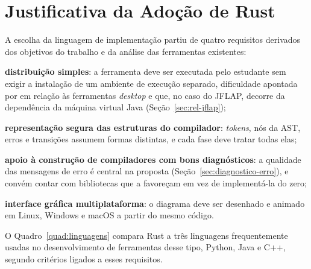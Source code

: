 \documentclass[
    12pt
    ,oneside
    ,a4paper
    ,chapter=TITLE
    ,section=TITLE
    ,sumario=abnt-6027-2012]{abntex2}
\begin{document}
\section{Justificativa da Adoção de Rust}
\label{sec:rust-justificativa}

A escolha da linguagem de implementação partiu de quatro requisitos derivados dos objetivos
do trabalho e da análise das ferramentas existentes:

\begin{alineas}
    \item \textbf{distribuição simples}: a ferramenta deve ser executada pelo estudante sem
    exigir a instalação de um ambiente de execução separado, dificuldade apontada por
     em relação às ferramentas \textit{desktop} e que, no caso
    do JFLAP, decorre da dependência da máquina virtual Java (Seção~\ref{sec:rel-jflap});
    \item \textbf{representação segura das estruturas do compilador}: \textit{tokens}, nós
    da AST, erros e transições assumem formas distintas, e cada fase deve tratar todas
    elas;
    \item \textbf{apoio à construção de compiladores com bons diagnósticos}: a qualidade das
    mensagens de erro é central na proposta (Seção~\ref{sec:diagnostico-erro}), e convém
    contar com bibliotecas que a favoreçam em vez de implementá-la do zero;
    \item \textbf{interface gráfica multiplataforma}: o diagrama deve ser desenhado e animado
    em Linux, Windows e macOS a partir do mesmo código.
\end{alineas}

O Quadro~\ref{quad:linguagens} compara Rust a três linguagens frequentemente usadas no
desenvolvimento de ferramentas desse tipo, Python, Java e C++, segundo critérios ligados a
esses requisitos.
\end{document}
